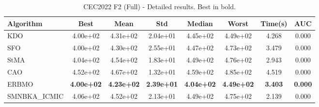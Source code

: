 \begin{table}[H]
\centering\small
\caption{CEC2022 F2 (Full) - Detailed results. Best in bold.}
\label{tab:cec2022_F2}
\begin{tabular}{lccccccc}
\toprule
\textbf{Algorithm} & \textbf{Best} & \textbf{Mean} & \textbf{Std} & \textbf{Median} & \textbf{Worst} & \textbf{Time(s)} & \textbf{AUC} \\
\midrule
KDO & 4.00e+02 & 4.31e+02 & 2.04e+01 & 4.45e+02 & 4.49e+02 & 4.268 & 0.000 \\
SFO & 4.00e+02 & 4.30e+02 & 2.55e+01 & 4.47e+02 & 4.73e+02 & 3.479 & 0.000 \\
StMA & 4.04e+02 & 4.54e+02 & 1.83e+01 & 4.49e+02 & 4.76e+02 & 2.943 & 0.000 \\
CAO & 4.52e+02 & 4.67e+02 & 1.32e+01 & 4.59e+02 & 4.85e+02 & 4.519 & 0.000 \\
ERBMO & \textbf{4.00e+02} & \textbf{4.23e+02} & \textbf{2.39e+01} & \textbf{4.04e+02} & \textbf{4.49e+02} & \textbf{3.403} & \textbf{0.000} \\
SMNBKA_ICMIC & 4.06e+02 & 4.52e+02 & 2.13e+01 & 4.49e+02 & 4.75e+02 & 2.139 & 0.000 \\
\bottomrule
\end{tabular}
\end{table}
